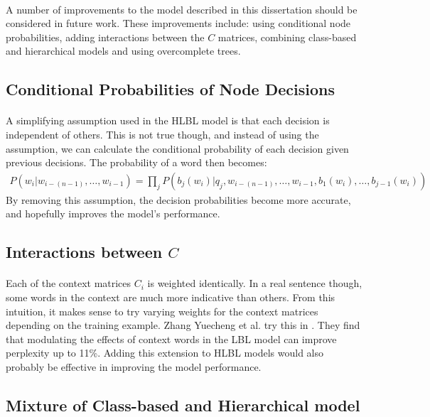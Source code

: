 \paragraph{}
A number of improvements to the model described in this dissertation should be considered in future work.
These improvements include: using conditional node probabilities, adding interactions between the $C$ matrices, combining class-based and hierarchical models and using overcomplete trees.
 
\subsection{Conditional Probabilities of Node Decisions}
\paragraph{}
A simplifying assumption used in the HLBL model is that each decision is independent of others. This is not true though, and instead of using the assumption, we can calculate the conditional probability of each decision given previous decisions. The probability of a word then becomes:
\begin{align}
P(w_i | w_{i-(n-1)},\dots, w_{i-1})  = \prod_j P(b_j(w_i) | q_j, w_{i-(n-1)},\dots, w_{i-1}, b_1(w_i), \dots, b_{j-1}(w_i))
\end{align}
By removing this assumption, the decision probabilities become more accurate, and hopefully improves the model's performance.

\subsection{Interactions between $C$}
\paragraph{}
Each of the context matrices $C_i$ is weighted identically. In a real sentence though, some words in the context are much more indicative than others. From this intuition, it makes sense to try varying weights for the context matrices depending on the training example. Zhang Yuecheng et al. try this in \cite{Yuecheng2008}. They find that modulating the effects of context words in the LBL model can improve perplexity up to 11\%. Adding this extension to HLBL models would also probably be effective in improving the model performance.

\subsection{Mixture of Class-based and Hierarchical model}
